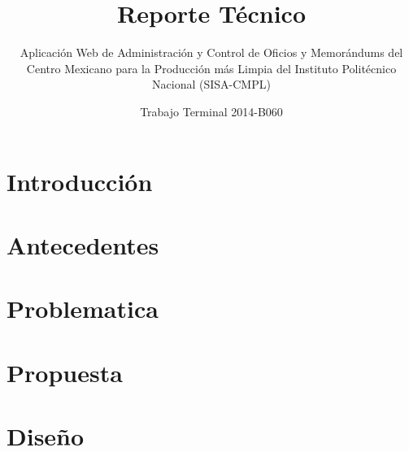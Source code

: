 \documentclass[oneside,10pt]{book}
\title{Reporte Técnico}
\subtitle{Aplicación Web de Administración y Control de Oficios y Memorándums del Centro Mexicano para la Producción más Limpia del Instituto Politécnico Nacional (SISA-CMPL)}
\author{Trabajo Terminal 2014-B060}
\begin{document}
\maketitle
\thispagestyle{empty}

\frontmatter
\tableofcontents

\mainmatter







\chapter{Introducción}


\chapter{Antecedentes}




\chapter{Problematica}


\chapter{Propuesta}


\chapter{Diseño}
\end{document}
